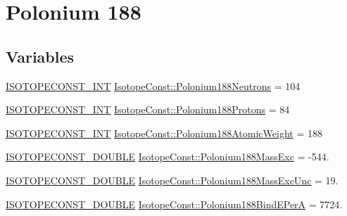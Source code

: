 \hypertarget{group___isotope_const-_polonium-_po188}{}\section{Polonium 188}
\label{group___isotope_const-_polonium-_po188}
\subsection*{Variables}
\begin{DoxyCompactItemize}
\item 
\mbox{\hyperlink{group___isotope_const-_macros_ga5f18360b3e99483a35c32d789e62621c}{I\+S\+O\+T\+O\+P\+E\+C\+O\+N\+S\+T\+\_\+\+I\+NT}} \mbox{\hyperlink{group___isotope_const-_polonium-_po188_gaa769056c2d9b77682f2481a7ca926892}{Isotope\+Const\+::\+Polonium188\+Neutrons}} = 104
\item 
\mbox{\hyperlink{group___isotope_const-_macros_ga5f18360b3e99483a35c32d789e62621c}{I\+S\+O\+T\+O\+P\+E\+C\+O\+N\+S\+T\+\_\+\+I\+NT}} \mbox{\hyperlink{group___isotope_const-_polonium-_po188_gaa3344398d4092443fea44dd8a209275c}{Isotope\+Const\+::\+Polonium188\+Protons}} = 84
\item 
\mbox{\hyperlink{group___isotope_const-_macros_ga5f18360b3e99483a35c32d789e62621c}{I\+S\+O\+T\+O\+P\+E\+C\+O\+N\+S\+T\+\_\+\+I\+NT}} \mbox{\hyperlink{group___isotope_const-_polonium-_po188_ga12de10468719f3c2f981e4b4cc9183b1}{Isotope\+Const\+::\+Polonium188\+Atomic\+Weight}} = 188
\item 
\mbox{\hyperlink{group___isotope_const-_macros_ga8f45a7272ce02c0b4c65c44636ed719a}{I\+S\+O\+T\+O\+P\+E\+C\+O\+N\+S\+T\+\_\+\+D\+O\+U\+B\+LE}} \mbox{\hyperlink{group___isotope_const-_polonium-_po188_ga9696e33684057577a9fb3258e48c291c}{Isotope\+Const\+::\+Polonium188\+Mass\+Exc}} = -\/544.
\item 
\mbox{\hyperlink{group___isotope_const-_macros_ga8f45a7272ce02c0b4c65c44636ed719a}{I\+S\+O\+T\+O\+P\+E\+C\+O\+N\+S\+T\+\_\+\+D\+O\+U\+B\+LE}} \mbox{\hyperlink{group___isotope_const-_polonium-_po188_gacda168e30c295162ab2082ba7697e5e4}{Isotope\+Const\+::\+Polonium188\+Mass\+Exc\+Unc}} = 19.
\item 
\mbox{\hyperlink{group___isotope_const-_macros_ga8f45a7272ce02c0b4c65c44636ed719a}{I\+S\+O\+T\+O\+P\+E\+C\+O\+N\+S\+T\+\_\+\+D\+O\+U\+B\+LE}} \mbox{\hyperlink{group___isotope_const-_polonium-_po188_ga22a8c8cfb7ccbfae67369ef4f1938f10}{Isotope\+Const\+::\+Polonium188\+Bind\+E\+PerA}} = 7724.
\item 

\end{DoxyCompactItemize}
